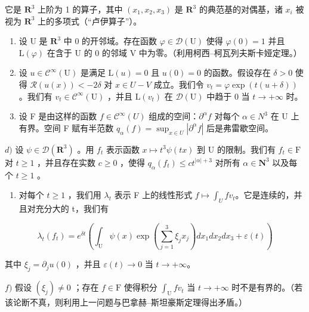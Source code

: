 它是 \(\mathbf{R}^{3}\) 上阶为 1 的算子，其中 \((x_{1}, x_{2}, x_{3})\) 是 \(\mathbf{R}^{3}\) 的典范基的对偶基，诸 \(x_{i}\) 被视为 \(\mathbf{R}^{3}\) 上的多项式（“卢伊算子”）。

\begin{enumerate}
\def\labelenumi{\alph{enumi})}
\item
  设 U 是 \(\mathbf{R}^3\) 中 0 的开邻域。存在函数 \(\varphi \in \mathcal{D}(\mathrm{U})\) 使得 \(\varphi(0) = 1\) 并且 \(\mathrm{L}(\varphi)\) 在含于 U 的 0 的邻域 V 中为零。（利用柯西–柯瓦列夫斯卡娅定理。）
\item
  设 \(u \in \mathcal{C}^{\infty}(\mathrm{U})\) 是满足 \(\mathrm{L}(u) = 0\) 且 \(u(0) = 0\) 的函数。假设存在 \(\delta > 0\) 使得 \(\mathcal{R}(u(x)) < -2\delta\) 对 \(x \in U - V\) 成立。我们令 \(v_{t} = \varphi \exp(t(u + \delta))\)。我们有 \(v_{t} \in \mathcal{C}^{\infty}(\mathrm{U})\) ，并且 \(\mathrm{L}(v_{t})\) 在 \(\mathcal{D}(\mathrm{U})\) 中趋于 0 当 \(t \to +\infty\) 时。
\item
  设 F 是由这样的函数 \(f \in \mathcal{C}^{\infty}(U)\) 组成的空间：\(\partial^{\alpha}f\) 对每个 \(\alpha \in N^{3}\) 在 U 上有界。空间 F 赋有半范数 \(q_{\alpha}(f) = \sup_{x \in U} |\partial^{\alpha}f|\) 后是弗雷歇空间。
\end{enumerate}

\(d)\) 设 \(\psi\in\mathcal{D}(\mathbf{R}^{3})\) 。用 \(f_{t}\) 表示函数 \(x\mapsto t^{3}\psi(tx)\) 到 U 的限制。我们有 \(f_{t}\in\mathrm{F}\) 对 \(t\geqslant1\) ，并且存在实数 \(c\geqslant0\) ，使得 \(q_{\alpha}(f_{t})\leqslant ct^{|\alpha|+3}\) 对所有 \(\alpha\in\mathbf{N}^{3}\) 以及每个 \(t\geqslant1\) 。

\begin{enumerate}
\def\labelenumi{\alph{enumi})}
\setcounter{enumi}{4}
\tightlist
\item
  对每个 \(t \geqslant 1\) ，我们用 \(\lambda_{t}\) 表示 F 上的线性形式 \(f \mapsto \int_{U} fv_{t}\)。它是连续的，并且对充分大的 t，我们有
\end{enumerate}

\[
\lambda_ {t} (f _ {t}) = e ^ {\delta t} \left(\int_ {\mathrm{U}} \psi (x) \exp \left(\sum_ {j = 1} ^ {3} \xi_ {j} x _ {j}\right) d x _ {1} d x _ {2} d x _ {3} + \varepsilon (t)\right)
\]

其中 \(\xi_{j} = \partial_{j}u(0)\) ，并且 \(\varepsilon (t)\to 0\) 当 \(t\rightarrow +\infty\)。

\(f)\) 假设 \((\xi_j) \neq 0\) ；存在 \(f \in \mathrm{F}\) 使得积分 \(\int_{\mathrm{U}} f v_t\) 当 \(t \to +\infty\) 时不是有界的。（若该论断不真，则利用上一问题与巴拿赫–斯坦豪斯定理得出矛盾。）

